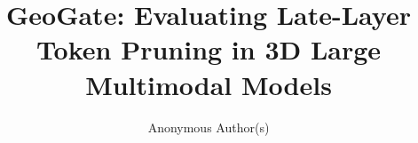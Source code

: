 \documentclass[10pt,twocolumn,letterpaper]{article}
\title{GeoGate: Evaluating Late-Layer Token Pruning in 3D Large Multimodal Models}
\author{Anonymous Author(s)}
\begin{document}
\maketitle







{
    \small
    
    
}

% 
\end{document}
